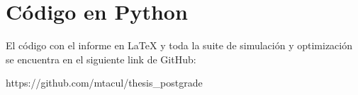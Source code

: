 \section{Código en Python}
\label{ap:Z10}

El código con el informe en LaTeX y toda la suite de simulación y optimización se encuentra en el siguiente link de GitHub:

https://github.com/mtacul/thesis\_postgrade

